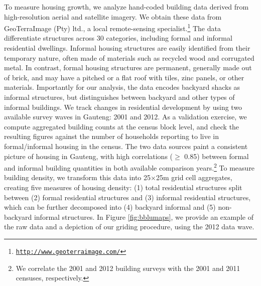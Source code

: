 \documentclass[12pt]{article}
\begin{document}

To measure housing growth, we analyze hand-coded building data derived from high-resolution aerial and satellite imagery. We obtain these data from GeoTerraImage (Pty) ltd., a local remote-sensing specialist.\footnote{\href{http://www.geoterraimage.com/}{\tt http://www.geoterraimage.com/}} The data differentiate structures across 30 categories, including formal and informal residential dwellings. Informal housing structures are easily identified from their temporary nature, often made of materials such as recycled wood and corrugated metal. In contrast, formal housing structures are permanent, generally made out of brick, and may have a pitched or a flat roof with tiles, zinc panels, or other materials. Importantly for our analysis, the data encodes backyard shacks as informal structures, but distinguishes between backyard and other types of informal buildings. We track changes in residential development by using two available survey waves in Gauteng: 2001 and 2012. As a validation exercise, we compute aggregated building counts at the census block level, and check the resulting figures against the number of households reporting to live in formal/informal housing in the census. The two data sources paint a consistent picture of housing in Gauteng, with high correlations ($\geq$ 0.85) between formal and informal building quantities in both available comparison years.\footnote{We correlate the 2001 and 2012 building surveys with the 2001 and 2011 censuses, respectively.}  To measure building density, we transform this data into 25$\times$25m grid cell aggregates, creating five measures of housing density: (1) total residential structures split between (2) formal residential structures and (3) informal residential structures, which can be further decomposed into (4) backyard informal and (5) non-backyard informal structures.  In Figure \ref{fig:bblumaps}, we provide an example of the raw data and a depiction of our griding procedure, using the 2012 data wave.
\end{document}

